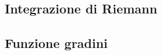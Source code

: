 \documentclass[a4paper]{article}
\begin{document}
%
%

\subsection{Integrazione di Riemann}

\subsection{Funzione gradini}
\end{document}
